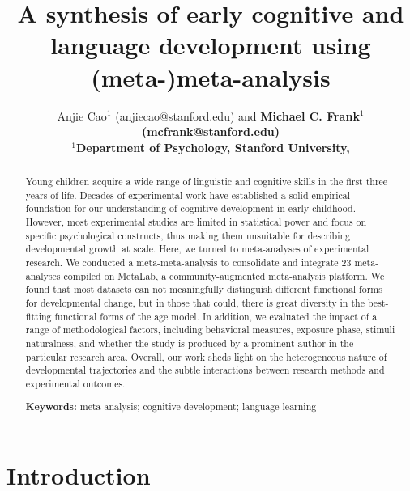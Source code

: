 \documentclass[10pt, letterpaper]{article}
\title{A synthesis of early cognitive and language development using
(meta-)meta-analysis}
\author{Anjie Cao$^1$  (anjiecao@stanford.edu)
 and \bf{Michael C. Frank$^1$ (mcfrank@stanford.edu)} \\
$^1$Department of Psychology, Stanford University, }
\begin{document}
\maketitle

\begin{abstract}
Young children acquire a wide range of linguistic and cognitive skills
in the first three years of life. Decades of experimental work have
established a solid empirical foundation for our understanding of
cognitive development in early childhood. However, most experimental
studies are limited in statistical power and focus on specific
psychological constructs, thus making them unsuitable for describing
developmental growth at scale. Here, we turned to meta-analyses of
experimental research. We conducted a meta-meta-analysis to consolidate
and integrate 23 meta-analyses compiled on MetaLab, a
community-augmented meta-analysis platform. We found that most datasets
can not meaningfully distinguish different functional forms for
developmental change, but in those that could, there is great diversity
in the best-fitting functional forms of the age model. In addition, we
evaluated the impact of a range of methodological factors, including
behavioral measures, exposure phase, stimuli naturalness, and whether
the study is produced by a prominent author in the particular research
area. Overall, our work sheds light on the heterogeneous nature of
developmental trajectories and the subtle interactions between research
methods and experimental outcomes.

\textbf{Keywords:}
meta-analysis; cognitive development; language learning
\end{abstract}

\hypertarget{introduction}{%
\section{Introduction}\label{introduction}}
\end{document}
